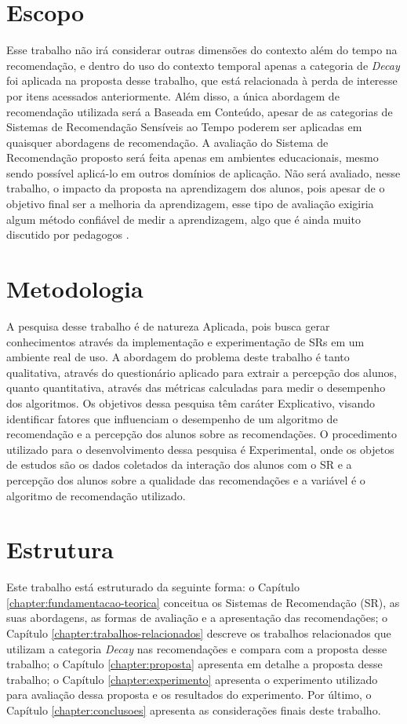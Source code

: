\section{Escopo}

Esse trabalho não irá considerar outras dimensões do contexto além do tempo na recomendação, e dentro do uso do contexto
temporal apenas a categoria de \textit{Decay} foi aplicada na proposta desse trabalho, que está relacionada à perda de
interesse por itens acessados anteriormente. Além disso, a única abordagem de recomendação utilizada será a Baseada em
Conteúdo, apesar de as categorias de Sistemas de Recomendação Sensíveis ao Tempo poderem ser aplicadas em quaisquer
abordagens de recomendação. A avaliação do Sistema de Recomendação proposto será feita apenas em ambientes educacionais,
mesmo sendo possível aplicá-lo em outros domínios de aplicação. Não será avaliado, nesse trabalho, o impacto da proposta
na aprendizagem dos alunos, pois apesar de o objetivo final ser a melhoria da aprendizagem, esse tipo de avaliação
exigiria algum método confiável de medir a aprendizagem, algo que é ainda muito discutido por pedagogos \cite{luckesi2014avaliaccao}.

\section{Metodologia}

A pesquisa desse trabalho é de natureza Aplicada, pois busca gerar conhecimentos através da implementação e experimentação
de SRs em um ambiente real de uso. A abordagem do problema deste trabalho é tanto qualitativa, através do questionário
aplicado para extrair a percepção dos alunos, quanto quantitativa, através das métricas calculadas para medir o desempenho
dos algoritmos. Os objetivos dessa pesquisa têm caráter Explicativo, visando identificar fatores que influenciam o
desempenho de um algoritmo de recomendação e a percepção dos alunos sobre as recomendações. O procedimento utilizado
para o desenvolvimento dessa pesquisa é Experimental, onde os objetos de estudos são os dados coletados da interação dos
alunos com o SR e a percepção dos alunos sobre a qualidade das recomendações e a variável é o algoritmo de recomendação
utilizado.

\section{Estrutura}

Este trabalho está estruturado da seguinte forma: o Capítulo \ref{chapter:fundamentacao-teorica} conceitua os Sistemas de
Recomendação (SR), as suas abordagens, as formas de avaliação e a apresentação das recomendações; o Capítulo \ref{chapter:trabalhos-relacionados}
descreve os trabalhos relacionados que utilizam a categoria \textit{Decay} nas recomendações e compara com a proposta desse
trabalho; o Capítulo \ref{chapter:proposta} apresenta em detalhe a proposta desse trabalho; o Capítulo \ref{chapter:experimento}
apresenta o experimento utilizado para avaliação dessa proposta e os resultados do experimento. Por último, o Capítulo \ref{chapter:conclusoes} apresenta
as considerações finais deste trabalho.


